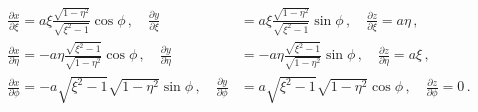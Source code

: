 \documentclass[a4paper,10pt]{article}
\begin{document}
  \begin{equation}\begin{split}
    \frac{\partial x}{\partial \xi} = a\xi \frac{\sqrt{1-\eta^2}}{\sqrt{\xi^2-1}} \cos{\phi}\, ,\quad
      \frac{\partial y}{\partial \xi} &= a\xi \frac{\sqrt{1-\eta^2}}{\sqrt{\xi^2-1}} \sin{\phi}\, ,\quad
      \frac{\partial z}{\partial \xi} = a\eta\, ,\\
    \frac{\partial x}{\partial \eta} = -a\eta \frac{\sqrt{\xi^2-1}}{\sqrt{1-\eta^2}} \cos{\phi}\, ,\quad
      \frac{\partial y}{\partial \eta} &= -a\eta \frac{\sqrt{\xi^2-1}}{\sqrt{1-\eta^2}} \sin{\phi}\, ,\quad
      \frac{\partial z}{\partial \eta} = a\xi\, ,\\
    \frac{\partial x}{\partial \phi} = -a\sqrt{\xi^2-1}\sqrt{1-\eta^2} \sin{\phi}\, ,\quad
      \frac{\partial y}{\partial \phi} &= a\sqrt{\xi^2-1}\sqrt{1-\eta^2} \cos{\phi}\, ,\quad
      \frac{\partial z}{\partial \phi} = 0\, .
  \end{split}\end{equation}
\end{document}
